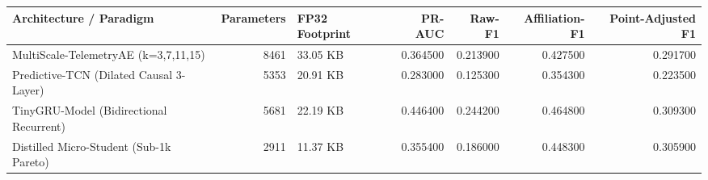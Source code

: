 \begin{tabular}{lrlrrrr}
\toprule
Architecture / Paradigm & Parameters & FP32 Footprint & PR-AUC & Raw-F1 & Affiliation-F1 & Point-Adjusted F1 \\
\midrule
MultiScale-TelemetryAE (k=3,7,11,15) & 8461 & 33.05 KB & 0.364500 & 0.213900 & 0.427500 & 0.291700 \\
Predictive-TCN (Dilated Causal 3-Layer) & 5353 & 20.91 KB & 0.283000 & 0.125300 & 0.354300 & 0.223500 \\
TinyGRU-Model (Bidirectional Recurrent) & 5681 & 22.19 KB & 0.446400 & 0.244200 & 0.464800 & 0.309300 \\
Distilled Micro-Student (Sub-1k Pareto) & 2911 & 11.37 KB & 0.355400 & 0.186000 & 0.448300 & 0.305900 \\
\bottomrule
\end{tabular}
